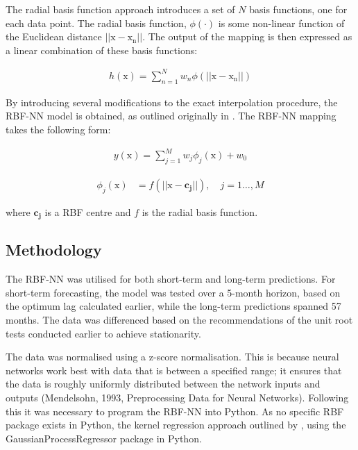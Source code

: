 \documentclass[11pt,a4paper]{article}
\newcommand{\citeboth}[1]{\citeauthor{#1} \citep{#1}}
\begin{document}
The radial basis function approach 
introduces a set of $N$ basis functions, one for each 
data point. The radial basis function, $\phi(\cdot)$ is some non-linear function of the Euclidean distance
$||\boldsymbol{\mathrm{x}} - \boldsymbol{\mathrm{x_n}}||$. The output of the mapping is then expressed as a linear combination of these basis functions:

\begin{align}
    h(\boldsymbol{\mathrm{x}}) = \sum_{n=1}^{N} w_n \phi(||\boldsymbol{\mathrm{x}} - \boldsymbol{\mathrm{x_n}}||)
\end{align}

By introducing several modifications to the exact interpolation 
procedure, the RBF-NN
model is obtained, as outlined originally in \citeboth{broomhead1988}. 
The RBF-NN mapping takes the following form:

\begin{align}
    y(\boldsymbol{\mathrm{x}}) =  \sum_{j=1}^{M} w_{j} \phi_j(\boldsymbol{\mathrm{x}}) + w_{0}
\end{align}



\begin{align}
    \phi_j(\boldsymbol{\mathrm{x}})  &= f(||\boldsymbol{\mathrm{x}-c_j}||), \quad{j=1\ldots,M}
\end{align}

where $\boldsymbol{c_j}$ is a RBF centre and $f$ is the radial basis function. 


\subsection{Methodology}

The RBF-NN was utilised for both short-term and long-term 
predictions. For short-term forecasting, 
the model was tested over a 5-month horizon, based on the optimum lag calculated earlier, while the long-term predictions spanned 57 months. 
The data was differenced based on the recommendations of the 
unit root tests conducted earlier to achieve stationarity. 

The data was normalised using a z-score normalisation. This is because
neural networks work best with data
that is between a specified range; it ensures that the data is roughly uniformly
distributed between the network inputs and outputs 
(Mendelsohn, 1993, Preprocessing Data for Neural Networks). Following this 
it was necessary to program the RBF-NN into Python. As no specific RBF package exists
in Python, the kernel regression approach outlined by 
\citeboth{bishop1995}, using the GaussianProcessRegressor package in Python.
\end{document}
